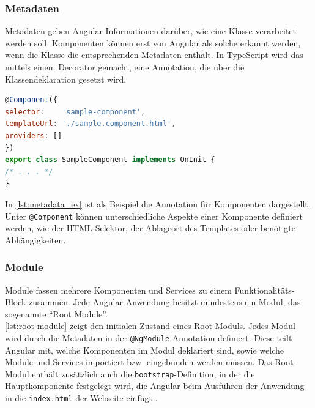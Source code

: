 \subsubsection{Metadaten}
Metadaten geben Angular Informationen darüber, wie eine Klasse verarbeitet werden soll. Komponenten können erst von Angular als solche erkannt werden, wenn die Klasse die entsprechenden Metadaten enthält.
In TypeScript wird das mittels einem Decorator gemacht, eine Annotation, die über die Klassendeklaration gesetzt wird.
\\
\begin{lstlisting}[language=JavaScript,caption={Beispiel Metadaten-Annotation für Komponenten},label=lst:metadata_ex]
@Component({
selector:    'sample-component',
templateUrl: './sample.component.html',
providers: []
})
export class SampleComponent implements OnInit {
/* . . . */
}
\end{lstlisting}

In \cref{lst:metadata_ex} ist als Beispiel die Annotation für Komponenten dargestellt. Unter \texttt{@Component} können unterschiedliche Aspekte einer Komponente definiert werden, wie der \acs{HTML}-Selektor, der Ablageort des Templates oder benötigte Abhängigkeiten.

\subsubsection{Module}
Module fassen mehrere Komponenten und Services zu einem Funktionalitäts-Block zusammen. Jede Angular Anwendung besitzt mindestens ein Modul, das sogenannte \enquote{Root Module}.
\\


\cref{lst:root-module} zeigt den initialen Zustand eines Root-Moduls. Jedes Modul wird durch die Metadaten in der \texttt{@NgModule}-Annotation definiert.
Diese teilt Angular mit, welche Komponenten im Modul deklariert sind, sowie welche Module und Services importiert bzw. eingebunden werden müssen.
Das Root-Modul enthält zusätzlich auch die \texttt{bootstrap}-Definition, in der die Hauptkomponente festgelegt wird, die Angular beim Ausführen der Anwendung in die \texttt{index.html} der Webseite einfügt \cite{Angular.io2017a}.

